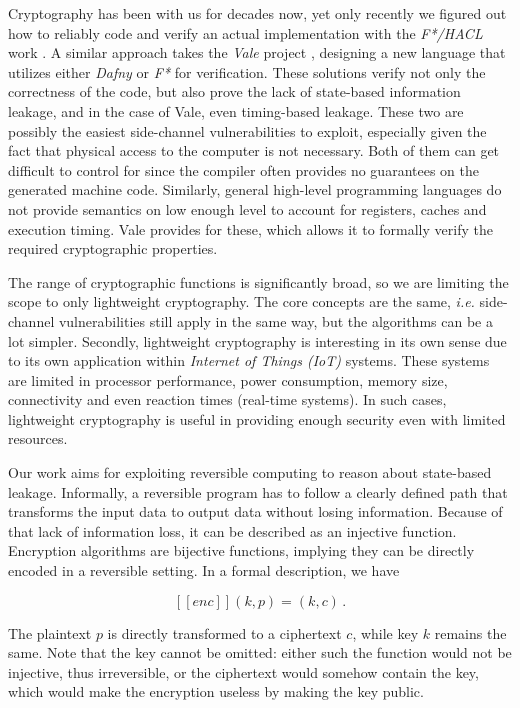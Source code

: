 \documentclass[a4paper,10pt,openright]{memoir}
\newcommand{\ie}{\emph{i.e.}\xspace}
\def\enc{\ensuremath{\mathit{enc}}}
\newcommand{\exe}[1]{\ensuremath{[\![#1]\!]}}
\newcommand{\term}[1]{\textit{#1}}
\begin{document}

Cryptography has been with us for decades now, yet only 
recently we figured out how to reliably code and verify an 
actual implementation with the \term{F*/HACL} work \cite{ProtzenkoEtal:2017}. 
A similar approach takes the \term{Vale} project \cite{BondEtal:2017:Vale}, 
designing a new language that utilizes either \term{Dafny} or \term{F*} for 
verification. These solutions verify not only the correctness of the 
code, but also prove the lack of state-based information leakage, and 
in the case of Vale, even timing-based leakage. These two are possibly 
the easiest side-channel vulnerabilities to exploit, especially given 
the fact that physical access to the computer is not necessary. Both of 
them can get difficult to control for since the compiler often provides 
no guarantees on the generated machine code. Similarly, general high-level programming 
languages do not provide semantics on low enough level to account for 
registers, caches and execution timing. Vale provides for these, which 
allows it to formally verify the required cryptographic properties.

The range of cryptographic functions is significantly broad, so we are 
limiting the scope to only lightweight cryptography. The core concepts 
are the same, \ie side-channel vulnerabilities still apply in the same 
way, but the algorithms can be a lot simpler. Secondly, lightweight 
cryptography is interesting in its own sense due to its own application 
within \term{Internet of Things (IoT)} systems. These systems are 
limited in processor performance, power consumption, memory size, 
connectivity and even reaction times (real-time systems). In such 
cases, lightweight cryptography is useful in providing enough security 
even with limited resources.

Our work aims for exploiting reversible computing to reason about 
state-based leakage. Informally, a reversible program has to follow a 
clearly defined path that transforms the input data to output data 
without losing information. Because of that lack of information loss, 
it can be described as an injective function. Encryption algorithms are 
bijective functions, implying they can be directly encoded in a 
reversible setting. In a formal description, we have

$$
\exe{\enc}(k,p) = (k,c) \,.
$$

The plaintext $p$ is directly transformed to a ciphertext $c$, while 
key $k$ remains the same. Note that the key cannot be omitted: either 
such the function would not be injective, thus irreversible, or the 
ciphertext would somehow contain the key, which would make the 
encryption useless by making the key public. 
\end{document}
